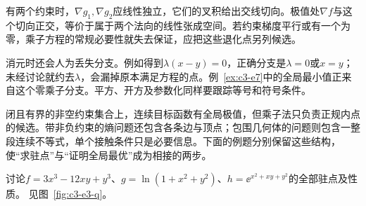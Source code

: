 有两个约束时，$\nabla g_1,\nabla g_2$应线性独立，它们的叉积给出交线切向。极值处$\nabla f$与这个切向正交，等价于属于两个法向的线性张成空间。若约束梯度平行或有一个为零，乘子方程的常规必要性就失去保证，应把这些退化点另列候选。

消元时还会人为丢失分支。例如得到$\lambda(x-y)=0$，正确分支是$\lambda=0$或$x=y$；未经讨论就约去$\lambda$，会漏掉原本满足方程的点。例~\ref{ex:c3-e7}中的全局最小值正来自这个零乘子分支。平方、开方及参数化同样要跟踪等号和符号条件。

闭且有界的非空约束集合上，连续目标函数有全局极值，但乘子法只负责正规内点的候选。带非负约束的熵问题还包含各条边与顶点；包围几何体的问题则包含一整段连续不等式，单个接触条件只是必要信息。下面的例题分别保留这些结构，使“求驻点”与“证明全局最优”成为相接的两步。

\begin{example}[三个二元函数的驻点分类]\label{ex:c3-e3}
讨论$f=3x^3-12xy+y^3$、$g=\ln(1+x^2+y^2)$、$h=\ee^{x^2+xy+y^2}$的全部驻点及性质。 见图~\ref{fig:c3-e3-q}。
\end{example}


